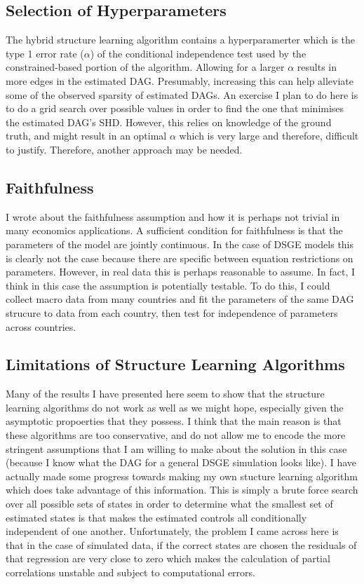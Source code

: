 \documentclass{article}
\begin{document}
\subsection{Selection of Hyperparameters}

The hybrid structure learning algorithm contains a hyperparamerter which is the type 1 error rate ($\alpha$) of the conditional independence test used by the constrained-based portion of the algorithm. Allowing for a larger $\alpha$ results in more edges in the estimated DAG. Presumably, increasing this can help alleviate some of the observed sparsity of estimated DAGs. An exercise I plan to do here is to do a grid search over possible values in order to find the one that minimises the estimated DAG's SHD. However, this relies on knowledge of the ground truth, and might result in an optimal $\alpha$ which is very large and therefore, difficult to justify. Therefore, another approach may be needed.

\subsection{Faithfulness}

I wrote about the faithfulness assumption and how it is perhaps not trivial in many economics applications. A sufficient condition for faithfulness is that the parameters of the model are jointly continuous. In the case of DSGE models this is clearly not the case because there are specific between equation restrictions on parameters. However, in real data this is perhaps reasonable to assume. In fact, I think in this case the assumption is potentially testable. To do this, I could collect macro data from many countries and fit the parameters of the same DAG strucure to data from each country, then test for independence of parameters across countries. 

\subsection{Limitations of Structure Learning Algorithms}

Many of the results I have presented here seem to show that the structure learning algorithms do not work as well as we might hope, especially given the asymptotic propoerties that they possess. I think that the main reason is that these algorithms are too conservative, and do not allow me to encode the more stringent assumptions that I am willing to make about the solution in this case (because I know what the DAG for a general DSGE simulation looks like). I have actually made some progress towards making my own stucture learning algorithm which does take advantage of this information. This is simply a brute force search over all possible sets of states in order to determine what the smallest set of estimated states is that makes the estimated controls all conditionally independent of one another. Unfortunately, the problem I came across here is that in the case of simulated data, if the correct states are chosen the residuals of that regression are very close to zero which makes the calculation of partial correlations unstable and subject to computational errors. 
\end{document}
